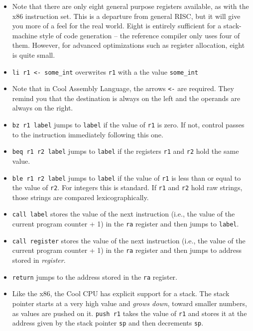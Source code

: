 \documentclass[]{article}
\begin{document}
\begin{itemize}
\itemsep1pt\parskip0pt
\item
  Note that there are only eight general purpose registers available, as
  with the x86 instruction set. This is a departure from general RISC,
  but it will give you more of a feel for the real world. Eight is
  entirely sufficient for a stack-machine style of code generation --
  the reference compiler only uses four of them. However, for advanced
  optimizations such as register allocation, eight is quite small.
\item
  \texttt{li r1 \textless{}- some\_int} overwrites \texttt{r1} with a
  the value \texttt{some\_int}
\item
  Note that in Cool Assembly Language, the arrows \texttt{\textless{}-}
  are required. They remind you that the destination is always on the
  left and the operands are always on the right.
\item
  \texttt{bz r1 label} jumps to \texttt{label} if the value of
  \texttt{r1} is zero. If not, control passes to the instruction
  immediately following this one.
\item
  \texttt{beq r1 r2 label} jumps to \texttt{label} if the registers
  \texttt{r1} and \texttt{r2} hold the same value.
\item
  \texttt{ble r1 r2 label} jumps to \texttt{label} if the value of
  \texttt{r1} is less than or equal to the value of \texttt{r2}. For
  integers this is standard. If \texttt{r1} and \texttt{r2} hold raw
  strings, those strings are compared lexicographically.
\item
  \texttt{call label} stores the value of the next instruction (i.e.,
  the value of the current program counter + 1) in the \texttt{ra}
  register and then jumps to \texttt{label}.
\item
  \texttt{call register} stores the value of the next instruction (i.e.,
  the value of the current program counter + 1) in the \texttt{ra}
  register and then jumps to address stored in \emph{register}.
\item
  \texttt{return} jumps to the address stored in the \texttt{ra}
  register.
\item
  Like the x86, the Cool CPU has explicit support for a stack. The stack
  pointer starts at a very high value and \emph{grows down}, toward
  smaller numbers, as values are pushed on it. \texttt{push r1} takes
  the value of \texttt{r1} and stores it at the address given by the
  stack pointer \texttt{sp} and then decrements \texttt{sp}.

\end{itemize}
\end{document}
